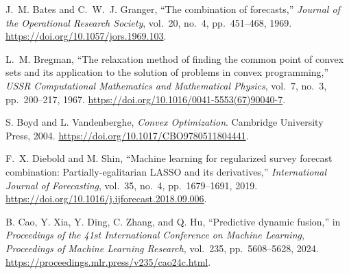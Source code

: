 
J.~M. Bates and C.~W.~J. Granger,
``The combination of forecasts,''
\emph{Journal of the Operational Research Society},
vol.~20, no.~4, pp.~451--468, 1969.
\url{https://doi.org/10.1057/jors.1969.103}.

L.~M. Bregman,
``The relaxation method of finding the common point of convex sets and its
application to the solution of problems in convex programming,''
\emph{USSR Computational Mathematics and Mathematical Physics},
vol.~7, no.~3, pp.~200--217, 1967.
\url{https://doi.org/10.1016/0041-5553(67)90040-7}.

S. Boyd and L. Vandenberghe,
\emph{Convex Optimization}.
Cambridge University Press, 2004.
\url{https://doi.org/10.1017/CBO9780511804441}.

F.~X. Diebold and M. Shin,
``Machine learning for regularized survey forecast combination:
Partially-egalitarian LASSO and its derivatives,''
\emph{International Journal of Forecasting},
vol.~35, no.~4, pp.~1679--1691, 2019.
\url{https://doi.org/10.1016/j.ijforecast.2018.09.006}.

B. Cao, Y. Xia, Y. Ding, C. Zhang, and Q. Hu,
``Predictive dynamic fusion,''
in \emph{Proceedings of the 41st International Conference on Machine Learning},
\emph{Proceedings of Machine Learning Research},
vol.~235, pp.~5608--5628, 2024.
\url{https://proceedings.mlr.press/v235/cao24c.html}.

